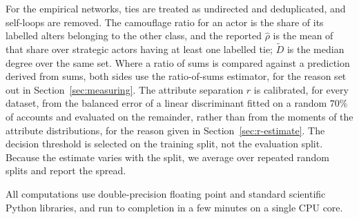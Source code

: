 \documentclass[../elsevier.tex]{subfiles}
\begin{document}
For the empirical networks, ties are treated as undirected and deduplicated, and
self-loops are removed. The camouflage ratio for an actor is the share of its labelled
alters belonging to the other class, and the reported $\hat\rho$ is the mean of that
share over strategic actors having at least one labelled tie; $\tilde D$ is the median
degree over the same set. Where a ratio of sums is compared against a prediction
derived from sums, both sides use the ratio-of-sums estimator, for the reason set out
in Section~\ref{sec:measuring}. The attribute separation $r$ is calibrated, for every dataset, from the
balanced error of a linear discriminant fitted on a random $70\%$ of accounts and
evaluated on the remainder, rather than from the moments of the attribute
distributions, for the reason given in Section~\ref{sec:r-estimate}. The decision
threshold is selected on the training split, not the evaluation split. Because the
estimate varies with the split, we average over repeated random splits and report the
spread.

All computations use double-precision floating point and standard scientific Python
libraries, and run to completion in a few minutes on a single CPU core.
\end{document}

